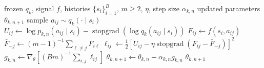 \begin{algorithm}[ht]
\caption{PMD-Mean inner update\\{\small\textit{Semantics: 中心化 target 在指数归一化集合上的投影}}}
\begin{algorithmic}[1]
\Require frozen $ q_k$, signal $f$, histories $\{s_i\}_{i=1}^{B}$, $m\ge2$, $\eta$, step size $\alpha_{k,n}$
\Ensure updated parameters $\theta_{k,n+1}$
        \State sample $a_{ij}\sim q_k(\cdot\mid s_i)$
        \State $U_{ij}\gets\log p_{k,n}(a_{ij}\mid s_i)-\operatorname{stopgrad}(\log q_k(a_{ij}\mid s_i))$
        \State $F_{ij}\gets f(s_i,a_{ij})$
    \EndFor
        \State $\bar F_{-j}\gets(m-1)^{-1}\sum_{\ell\ne j}F_{i\ell}$
        \State $\ell_{ij}\gets\frac12[U_{ij}-\eta\operatorname{stopgrad}(F_{ij}-\bar F_{-j})]^2$
    \EndFor
\EndFor
\State $g_{k,n}\gets\nabla_\theta[(Bm)^{-1}\sum_{i,j}\ell_{ij}]$
\State $\theta_{k,n+1}\gets\theta_{k,n}-\alpha_{k,n}g_{k,n}$
\State \Return $\theta_{k,n+1}$
\end{algorithmic}
\end{algorithm}
